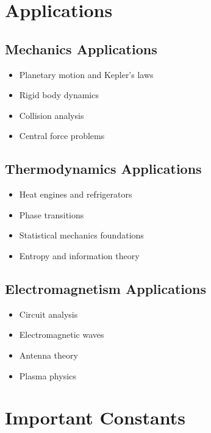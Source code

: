 \documentclass[11pt]{article}
\theoremstyle{definition}
\begin{document}
\section{Applications}

\subsection{Mechanics Applications}
\begin{itemize}
    \item Planetary motion and Kepler's laws
    \item Rigid body dynamics
    \item Collision analysis
    \item Central force problems
\end{itemize}

\subsection{Thermodynamics Applications}
\begin{itemize}
    \item Heat engines and refrigerators
    \item Phase transitions
    \item Statistical mechanics foundations
    \item Entropy and information theory
\end{itemize}

\subsection{Electromagnetism Applications}
\begin{itemize}
    \item Circuit analysis
    \item Electromagnetic waves
    \item Antenna theory
    \item Plasma physics
\end{itemize}

\section{Important Constants}
\end{document}
